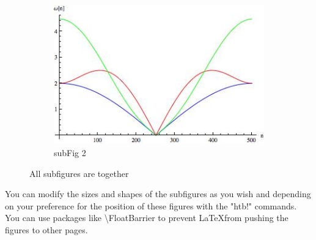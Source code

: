 \begin{figure}[ht]
\begin{subfigure}[h]{0.45\textwidth}
	\end{subfigure}
	\centering
	\begin{subfigure}[h]{0.45\textwidth}
		\centering
		\includegraphics[height=0.7\linewidth,width=\linewidth]{chapter-2/fig/dispersion}
		\caption{subFig 2}
		
	\end{subfigure}
	\caption{All subfigures are together}
	\label{multfig}

\end{figure}
\FloatBarrier
	
You can modify the sizes and shapes of the subfigures as you wish and depending on your preference for the position of these figures with the "htb!" commands. You can use packages like \textbackslash FloatBarrier to prevent \LaTeX from pushing the figures to other pages.






